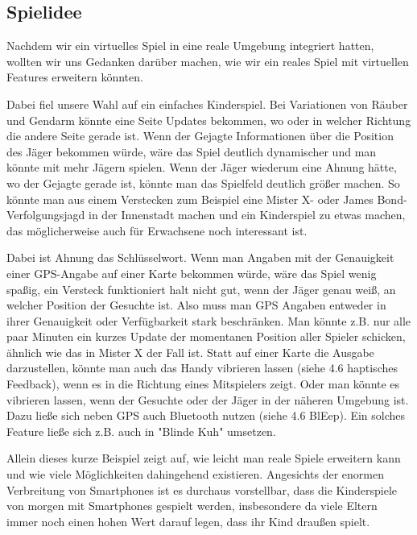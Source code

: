 \subsection{Spielidee}
Nachdem wir ein virtuelles Spiel in eine reale Umgebung integriert hatten, wollten wir uns Gedanken darüber machen, wie wir ein reales Spiel mit virtuellen Features erweitern könnten. 

Dabei fiel unsere Wahl auf ein einfaches Kinderspiel. Bei Variationen von Räuber und Gendarm könnte eine Seite Updates bekommen, wo oder in welcher Richtung die andere Seite gerade ist. Wenn der Gejagte Informationen über die Position des Jäger bekommen würde, wäre das Spiel deutlich dynamischer und man könnte mit mehr Jägern spielen. Wenn der Jäger wiederum eine Ahnung hätte, wo der Gejagte gerade ist, könnte man das Spielfeld deutlich größer machen. So könnte man aus einem Verstecken zum Beispiel eine Mister X- oder James Bond-Verfolgungsjagd in der Innenstadt machen und ein Kinderspiel zu etwas machen, das möglicherweise auch für Erwachsene noch interessant ist.

Dabei ist Ahnung das Schlüsselwort. Wenn man Angaben mit der Genauigkeit einer GPS-Angabe auf einer Karte bekommen würde, wäre das Spiel wenig spaßig, ein Versteck funktioniert halt nicht gut, wenn der Jäger genau weiß, an welcher Position der Gesuchte ist. Also muss man GPS Angaben entweder in ihrer Genauigkeit oder Verfügbarkeit stark beschränken. Man könnte z.B. nur alle paar Minuten ein kurzes Update der momentanen Position aller Spieler schicken, ähnlich wie das in Mister X der Fall ist. Statt auf einer Karte die Ausgabe darzustellen, könnte man auch das Handy vibrieren lassen (siehe 4.6 haptisches Feedback), wenn es in die Richtung eines Mitspielers zeigt. Oder man könnte es vibrieren lassen, wenn der Gesuchte oder der Jäger in der näheren Umgebung ist. Dazu ließe sich neben GPS auch Bluetooth nutzen (siehe 4.6 BlEep). Ein solches Feature ließe sich z.B. auch in "Blinde Kuh" umsetzen.

Allein dieses kurze Beispiel zeigt auf, wie leicht man reale Spiele erweitern kann und wie viele Möglichkeiten dahingehend existieren. Angesichts der enormen Verbreitung von Smartphones ist es durchaus vorstellbar, dass die Kinderspiele von morgen mit Smartphones gespielt werden, insbesondere da viele Eltern immer noch einen hohen Wert darauf legen, dass ihr Kind draußen spielt.